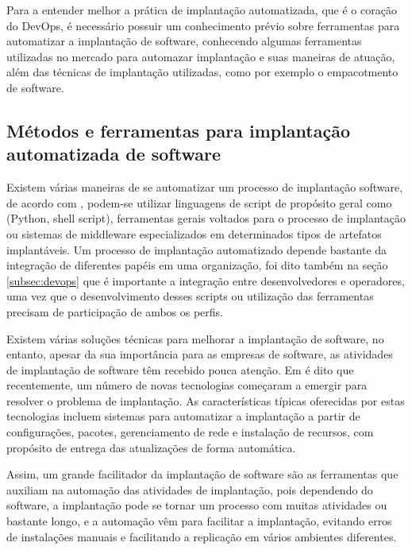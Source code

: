 Para a entender melhor a prática de implantação automatizada, que é o coração
do DevOps, é necessário possuir um conhecimento prévio sobre ferramentas para
automatizar a implantação de software, conhecendo algumas ferramentas utilizadas
no mercado para automazar implantação e suas maneiras de atuação, além das técnicas
de implantação utilizadas, como por exemplo o empacotmento de software.

\subsection{Métodos e ferramentas para implantação automatizada de software}
\label{subsec:metodoseferramentas}


Existem várias maneiras de se automatizar um processo de implantação software,
de acordo com \cite{leo2014}, podem-se utilizar linguagens de script de propósito
geral como (Python, shell script), ferramentas gerais voltados para o processo
de implantação ou sistemas de middleware especializados em determinados tipos de artefatos implantáveis.
Um processo de implantação automatizado depende bastante da integração de diferentes papéis
em uma organização, foi dito também na seção \ref{subsec:devops} que é importante a
integração entre desenvolvedores e operadores, uma vez que o desenvolvimento desses
scripts ou utilização das ferramentas precisam de participação de ambos os perfis.

Existem várias soluções técnicas  para melhorar a implantação de software,
\cite{5741269} no entanto, apesar da sua importância para as empresas de software, as atividades
de implantação de software têm recebido pouca atenção. Em \cite{deployment1998}
é dito que recentemente, um número de novas tecnologias começaram a emergir para
resolver o problema de implantação. As características típicas oferecidas por
estas tecnologias incluem sistemas para automatizar a implantação a partir de
configurações, pacotes, gerenciamento de rede e instalação de recursos, com
propósito de entrega das atualizações de forma automática.

Assim, um grande facilitador da implantação de software são as ferramentas que auxiliam na
automação das atividades de implantação, pois dependendo do software, a implantação
pode se tornar um processo com muitas atividades ou bastante longo, e a automação
vêm para facilitar a implantação, evitando erros de instalações manuais e facilitando a replicação em
vários ambientes diferentes.


